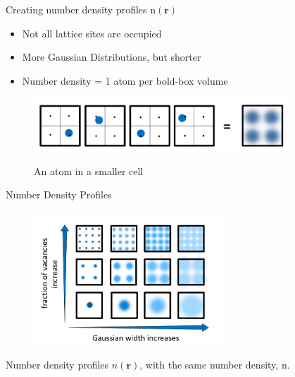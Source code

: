 \documentclass{beamer}
\renewcommand{\vec}[1]{\mathbf{#1}}
\begin{document}
\begin{frame}{Creating number density profiles $\text{n}(\vec r)$}
    \begin{itemize}
	    \item Not all lattice sites are occupied
		\item More Gaussian Distributions, but shorter
		\item Number density = 1 atom per bold-box volume
	\end{itemize}	

    \begin{figure}
       \centering
       \includegraphics[height=2cm]{Ensemble_Smallcells.png}
       \label{fig:Ensemble_Smallcells}
       
       An atom in a smaller cell
    \end{figure}     
\end{frame}



\begin{frame}{Number Density Profiles}
    \begin{figure}
       \centering
       \includegraphics[height=5cm]{VaryWidthandVacancies.png}
       \label{fig:Ensemble_vary}
    \end{figure}  
    Number density profiles $n(\vec r)$, with the same number density, n.
\end{frame}
\end{document}
